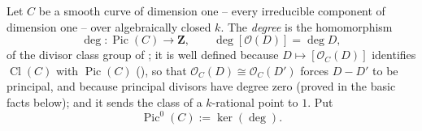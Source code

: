 \begin{definition}
\label{def:pcb-pic0}
Let \(C\) be a  smooth curve of
dimension one -- every irreducible component of dimension one -- over
algebraically closed \(k\).  The \emph{degree} is the homomorphism
\[
 \deg:\operatorname{Pic}(C)\to\mathbf Z,\qquad
 \deg[\mathcal O(D)]=\deg D,
\]
of the divisor class group of ; it is well
defined because \(D\mapsto[\mathcal O_C(D)]\) identifies
\(\operatorname{Cl}(C)\) with \(\operatorname{Pic}(C)\)
(), so that
\(\mathcal O_C(D)\cong\mathcal O_C(D')\) forces \(D-D'\) to be
principal, and because principal divisors have degree zero (proved in
the basic facts below); and it sends the class of a \(k\)-rational
point to \(1\).  Put
\[
 \operatorname{Pic}^0(C):=\ker(\deg).
\]
\end{definition}

